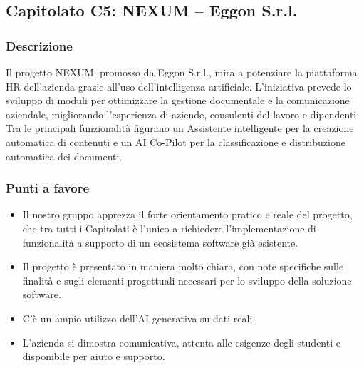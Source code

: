 \documentclass[a4paper,12pt]{article}
\begin{document}
\subsection{Capitolato C5: NEXUM – Eggon S.r.l.}

\subsubsection{Descrizione}
Il progetto NEXUM, promosso da Eggon S.r.l., mira a potenziare la piattaforma HR dell’azienda grazie all’uso dell’intelligenza artificiale. L’iniziativa prevede lo sviluppo di moduli per ottimizzare la gestione documentale e la comunicazione aziendale, migliorando l’esperienza di aziende, consulenti del lavoro e dipendenti. Tra le principali funzionalità figurano un Assistente intelligente per la creazione automatica di contenuti e un AI Co-Pilot per la classificazione e distribuzione automatica dei documenti.

\subsubsection{Punti a favore}
\begin{itemize}
    \item Il nostro gruppo apprezza il forte orientamento pratico e reale del progetto, che tra tutti i Capitolati è l’unico a richiedere l’implementazione di funzionalità a supporto di un ecosistema software già esistente.
    \item Il progetto è presentato in maniera molto chiara, con note specifiche sulle finalità e sugli elementi progettuali necessari per lo sviluppo della soluzione software.
    \item C’è un ampio utilizzo dell’AI generativa su dati reali.
    \item L’azienda si dimostra comunicativa, attenta alle esigenze degli studenti e disponibile per aiuto e supporto.
\end{itemize}
\end{document}
